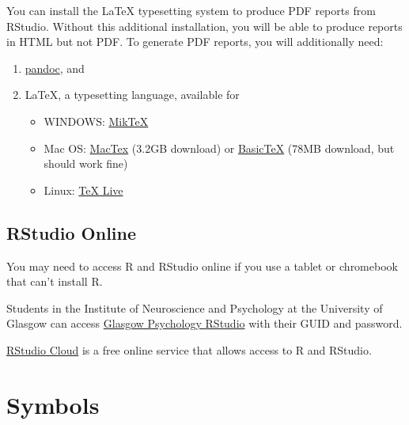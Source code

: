 \documentclass[
  oneside]{book}
\providecommand{\tightlist}{%
  \setlength{\itemsep}{0pt}\setlength{\parskip}{0pt}}
\begin{document}
You can install the LaTeX typesetting system to produce PDF reports from RStudio. Without this additional installation, you will be able to produce reports in HTML but not PDF. To generate PDF reports, you will additionally need:

\begin{enumerate}
\def\labelenumi{\arabic{enumi}.}
\tightlist
\item
  \href{http://pandoc.org/installing.html}{pandoc}, and
\item
  LaTeX, a typesetting language, available for

  \begin{itemize}
  \tightlist
  \item
    WINDOWS: \href{http://miktex.org/}{MikTeX}
  \item
    Mac OS: \href{https://tug.org/mactex/downloading.html}{MacTex} (3.2GB download) or \href{http://ww.tug.org/mactex/morepackages.html}{BasicTeX} (78MB download, but should work fine)
  \item
    Linux: \href{https://www.tug.org/texlive/}{TeX Live}
  \end{itemize}
\end{enumerate}

\hypertarget{rstudio-online}{%
\section{RStudio Online}\label{rstudio-online}}

You may need to access R and RStudio online if you use a tablet or chromebook that can't install R.

Students in the Institute of Neuroscience and Psychology at the University of Glasgow can access \href{https://rstudio.psy.gla.ac.uk}{Glasgow Psychology RStudio} with their GUID and password.

\href{https://rstudio.cloud/}{RStudio Cloud} is a free online service that allows access to R and RStudio.

\hypertarget{symbols}{%
\chapter{Symbols}\label{symbols}}
\end{document}
